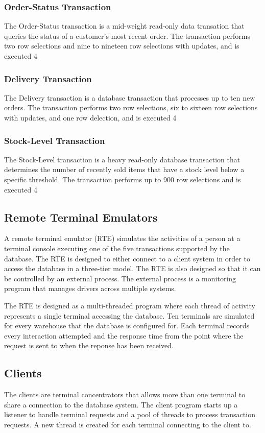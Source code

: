 \documentclass{article}
\begin{document}
\subsubsection{Order-Status Transaction}

The Order-Status transaction is a mid-weight read-only data transation that
queries the status of a customer's most recent order.  The transaction
performs two row selections and nine to nineteen row selections with updates,
and is executed 4%

\subsubsection{Delivery Transaction}

The Delivery transaction is a database transaction that processes up to ten
new orders.  The transaction performs two row selections, six to sixteen row
selections with updates, and one row delection, and is executed 4%

\subsubsection{Stock-Level Transaction}

The Stock-Level transaction is a heavy read-only database transaction that
determines the number of recently sold items that have a stock level below a
specific threshold.  The transaction performs up to 900 row selections and is
executed 4%

\subsection{Remote Terminal Emulators}

A remote terminal emulator (RTE) simulates the activities of a person at a
terminal console executing one of the five transactions supported by the
database.  The RTE is designed to either connect to a client system in order
to access the database in a three-tier model.  The RTE is also designed so
that it can be controlled by an external process.  The external process is a
monitoring program that manages drivers across multiple systems.

The RTE is designed as a multi-threaded program where each thread of activity
represents a single terminal accessing the database.  Ten terminals are
simulated for every warehouse that the database is configured for.  Each
terminal records every interaction attempted and the response time from the
point where the request is sent to when the reponse has been received.

\subsection{Clients}

The clients are terminal concentrators that allows more than one terminal to
share a connection to the database system.  The client program starts up a
listener to handle terminal requests and a pool of threads to process
transaction requests.  A new thread is created for each terminal connecting
to the client to.
\end{document}
